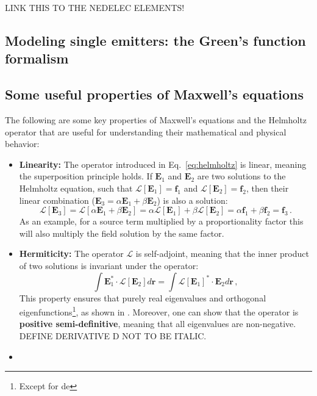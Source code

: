  LINK THIS TO THE NEDELEC ELEMENTS!

\subsection*{Modeling single emitters: the Green's function formalism}

\subsection*{Some useful properties of Maxwell's equations}
The following are some key properties of Maxwell's equations and the Helmholtz operator that are useful for understanding their mathematical and physical behavior:
\begin{itemize}
    \item \textbf{Linearity:} The operator introduced in Eq.~\eqref{eq:helmholtz} is linear, meaning the superposition principle holds. If $\mathbf{E}_1$ and $\mathbf{E}_2$ are two solutions to the Helmholtz equation, such that $\mathcal{L}[\mathbf{E}_1] = \mathbf{f}_1$ and $\mathcal{L}[\mathbf{E}_2] = \mathbf{f}_2$, then their linear combination ($\mathbf{E}_3 = \alpha \mathbf{E}_1 + \beta \mathbf{E}_2$) is also a solution:
    \begin{equation}
        \mathcal{L}[\mathbf{E}_3] = \mathcal{L}[\alpha \mathbf{E}_1 + \beta \mathbf{E}_2] = \alpha \mathcal{L}[\mathbf{E}_1] + \beta \mathcal{L}[\mathbf{E}_2] = \alpha \mathbf{f}_1 + \beta \mathbf{f}_2 = \mathbf{f}_3\,.
    \end{equation}
    As an example, for a source term multiplied by a proportionality factor this will also multiply the field solution by the same factor. 

    \item \textbf{Hermiticity:} The operator $\mathcal{L}$ is self-adjoint, meaning that the inner product of two solutions is invariant under the operator:
    \begin{equation}
        \int \mathbf{E}_1^* \cdot \mathcal{L}[\mathbf{E}_2] d\mathbf{r} = \int \mathcal{L}[\mathbf{E}_1]^* \cdot \mathbf{E}_2 d\mathbf{r}\,,
    \end{equation}
    This property ensures that purely real eigenvalues and orthogonal eigenfunctions\footnote{Except for de}, as shown in \cite{phot_crys}. Moreover,
    one can show that the operator is \textbf{positive semi-definitive}, meaning that all eigenvalues are non-negative.
    DEFINE DERIVATIVE D NOT TO BE ITALIC.
    \item 
\end{itemize}



